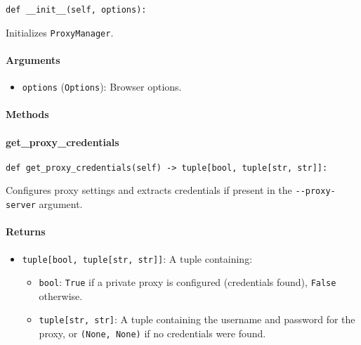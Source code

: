 \documentclass{article}
\begin{document}
\begin{lstlisting}[style=pythonstyle]
def __init__(self, options):
\end{lstlisting}
\noindent Initializes \lstinline[style=pythonstyle]|ProxyManager|.

\paragraph{Arguments}

\begin{itemize}
    \item \lstinline[style=pythonstyle]|options| (\lstinline[style=pythonstyle]|Options|): Browser options.
\end{itemize}

\paragraph{Methods}
\paragraph{get\_proxy\_credentials}

\begin{lstlisting}[style=pythonstyle]
def get_proxy_credentials(self) -> tuple[bool, tuple[str, str]]:
\end{lstlisting}

\noindent Configures proxy settings and extracts credentials if present in the \lstinline[style=pythonstyle]|--proxy-server| argument.

\paragraph{Returns}

\begin{itemize}
    \item \lstinline[style=pythonstyle]|tuple[bool, tuple[str, str]]|: A tuple containing:
          \begin{itemize}
              \item \lstinline[style=pythonstyle]|bool|: \lstinline[style=pythonstyle]|True| if a private proxy is configured (credentials found), \lstinline[style=pythonstyle]|False| otherwise.
              \item \lstinline[style=pythonstyle]|tuple[str, str]|: A tuple containing the username and password for the proxy, or \lstinline[style=pythonstyle]|(None, None)| if no credentials were found.
          \end{itemize}
\end{itemize}
\end{document}
